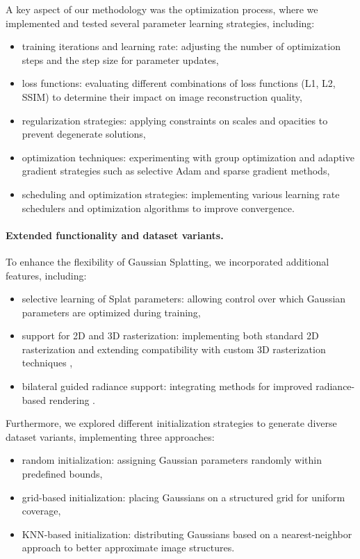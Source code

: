 A key aspect of our methodology was the optimization process, where we implemented and tested several parameter learning strategies, including:

\begin{itemize}
    \item training iterations and learning rate: adjusting the number of optimization steps and the step size for parameter updates,
    \item loss functions: evaluating different combinations of loss functions (L1, L2, SSIM) to determine their impact on image reconstruction quality,
    \item regularization strategies: applying constraints on scales and opacities to prevent degenerate solutions,
    \item optimization techniques: experimenting with group optimization and adaptive gradient strategies such as selective Adam and sparse gradient methods,
    \item scheduling and optimization strategies: implementing various learning rate schedulers and optimization algorithms to improve convergence.
\end{itemize}

\paragraph{Extended functionality and dataset variants.}
To enhance the flexibility of Gaussian Splatting, we incorporated additional features, including:

\begin{itemize}
    \item selective learning of Splat parameters: allowing control over which Gaussian parameters are optimized during training,
    \item support for 2D and 3D rasterization: implementing both standard 2D rasterization and extending compatibility with custom 3D rasterization techniques \cite{kerbl20233dgs},
    \item bilateral guided radiance support: integrating methods for improved radiance-based rendering \cite{wang2024bilateralgr}.
\end{itemize}

Furthermore, we explored different initialization strategies to generate diverse dataset variants, implementing three approaches:

\begin{itemize}
    \item random initialization: assigning Gaussian parameters randomly within predefined bounds,
    \item grid-based initialization: placing Gaussians on a structured grid for uniform coverage,
    \item KNN-based initialization: distributing Gaussians based on a nearest-neighbor approach to better approximate image structures.
\end{itemize}

